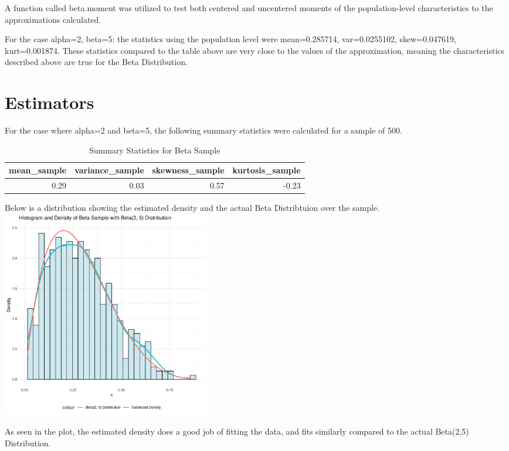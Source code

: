 \documentclass{article}\usepackage[]{graphicx}\usepackage[]{xcolor}
\newenvironment{knitrout}{}{} %
\begin{document}
\begin{multicols}{2}
A function called beta.moment was utilized to test both centered and uncentered moments of the population-level characteristics to the approximations calculated. 

For the case alpha=2, beta=5: the statistics using the population level were mean=0.285714, var=0.0255102, skew=0.047619, kurt=0.001874.
These statistics compared to the table above are very close to the values of the approximation, meaning the characteristics described above are true for the Beta Distribution.

\section{Estimators}
For the case where alpha=2 and beta=5, the following summary statistics were calculated for a sample of 500.



\begin{table}[H]
\centering
\begingroup\small
\begin{tabular}{rrrr}
  \hline
mean\_sample & variance\_sample & skewness\_sample & kurtosis\_sample \\ 
  \hline
0.29 & 0.03 & 0.57 & -0.23 \\ 
   \hline
\end{tabular}
\endgroup
\caption{Summary Statistics for Beta Sample} 
\end{table}


Below is a distribution showing the estimated density and the actual Beta Distribtuion over the sample.
\begin{knitrout}
\color{fgcolor}
\includegraphics[width=0.4\textwidth,height=0.2\textheight]{figure/plot_beta_sample-1} 
\end{knitrout}

As seen in the plot, the estimated density does a good job of fitting the data, and fits similarly compared to the actual Beta(2,5) Distribution.


\end{multicols}
\end{document}
